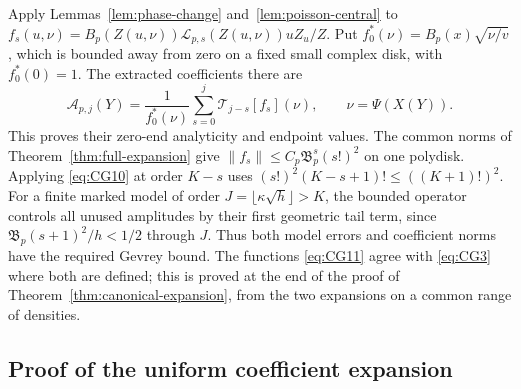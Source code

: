 Apply Lemmas~\ref{lem:phase-change} and~\ref{lem:poisson-central} to
$f_s(u,\nu)=B_p(Z(u,\nu))\mathcal L_{p,s}(Z(u,\nu))uZ_u/Z$.
Put $f_0^*(\nu)=B_p(x)\sqrt{\nu/v}$, which is bounded away from
zero on a fixed small complex disk, with $f_0^*(0)=1$.
The extracted coefficients there are
\begin{equation}
 \mathcal A_{p,j}(Y)=\frac1{f_0^*(\nu)}
       \sum_{s=0}^j\mathscr T_{j-s}[f_s](\nu),\qquad \nu=\Psi(X(Y)).
 \label{eq:CG11}
\end{equation}
This proves their zero-end analyticity and endpoint values.
The common norms of Theorem~\ref{thm:full-expansion} give
$\|f_s\|\le C_p\mathfrak B_p^s(s!)^2$ on one polydisk. Applying
\eqref{eq:CG10} at order $K-s$ uses
$(s!)^2(K-s+1)!\le((K+1)!)^2$.
For a finite marked model of order $J=\lfloor\kappa\sqrt h\rfloor>K$,
the bounded operator controls all unused amplitudes by their first
geometric tail term, since $\mathfrak B_p(s+1)^2/h<1/2$ through $J$.
Thus both model errors and coefficient norms have the required Gevrey
bound. The functions \eqref{eq:CG11} agree with \eqref{eq:CG3} where
both are defined; this is proved at the end of the proof of
Theorem~\ref{thm:canonical-expansion}, from the two expansions on a
common range of densities.

\subsection{Proof of the uniform coefficient expansion}\label{app:canonical-proof}

